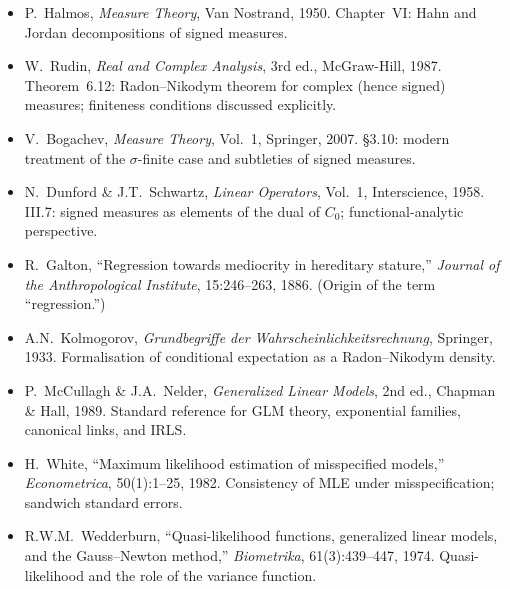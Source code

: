 \documentclass[12pt, a4paper]{article}
\theoremstyle{definition}
\begin{document}
\begin{itemize}[itemsep=6pt]
  \item P.~Halmos, \textit{Measure Theory}, Van Nostrand, 1950.
    Chapter~VI: Hahn and Jordan decompositions of signed measures.

  \item W.~Rudin, \textit{Real and Complex Analysis}, 3rd ed.,
    McGraw-Hill, 1987.
    Theorem~6.12: Radon--Nikodym theorem for complex (hence signed)
    measures; finiteness conditions discussed explicitly.

  \item V.~Bogachev, \textit{Measure Theory}, Vol.~1,
    Springer, 2007.
    \S3.10: modern treatment of the $\sigma$-finite case
    and subtleties of signed measures.

  \item N.~Dunford \& J.T.~Schwartz,
    \textit{Linear Operators}, Vol.~1,
    Interscience, 1958.
    III.7: signed measures as elements of the dual of $C_0$;
    functional-analytic perspective.

  \item R.~Galton, ``Regression towards mediocrity in hereditary
    stature,'' \textit{Journal of the Anthropological Institute},
    15:246--263, 1886.
    (Origin of the term ``regression.'')

  \item A.N.~Kolmogorov, \textit{Grundbegriffe der
    Wahrscheinlichkeitsrechnung}, Springer, 1933.
    Formalisation of conditional expectation as a
    Radon--Nikodym density.

  \item P.~McCullagh \& J.A.~Nelder,
    \textit{Generalized Linear Models}, 2nd ed.,
    Chapman \& Hall, 1989.
    Standard reference for GLM theory, exponential families,
    canonical links, and IRLS.

  \item H.~White, ``Maximum likelihood estimation of misspecified
    models,'' \textit{Econometrica}, 50(1):1--25, 1982.
    Consistency of MLE under misspecification; sandwich
    standard errors.

  \item R.W.M.~Wedderburn, ``Quasi-likelihood functions,
    generalized linear models, and the Gauss--Newton method,''
    \textit{Biometrika}, 61(3):439--447, 1974.
    Quasi-likelihood and the role of the variance function.
\end{itemize}
\end{document}

